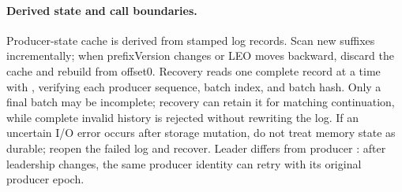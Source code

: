 \paragraph{Derived state and call boundaries.}Producer-state cache is derived from stamped log records. Scan new suffixes incrementally; when prefixVersion changes or LEO moves backward, discard the cache and rebuild from offset0. Recovery reads one complete record at a time with , verifying each producer sequence, batch index, and batch hash. Only a final batch may be incomplete; recovery can retain it for matching continuation, while complete invalid history is rejected without rewriting the log. If an uncertain I/O error occurs after storage mutation, do not treat memory state as durable; reopen the failed log and recover. Leader  differs from producer : after leadership changes, the same producer identity can retry with its original producer epoch.
